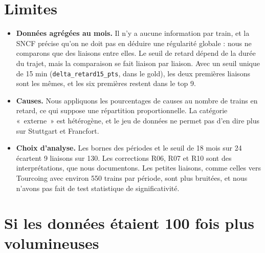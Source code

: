 \documentclass[10pt,a4paper]{article}
\newcommand{\code}[1]{\texttt{\small #1}}
\begin{document}
\section{Limites}
\begin{itemize}
  \item \textbf{Données agrégées au mois.} Il n'y a aucune information par train, et la SNCF précise qu'on ne doit pas en déduire une régularité globale : nous ne comparons que des liaisons entre elles. Le seuil de retard dépend de la durée du trajet, mais la comparaison se fait liaison par liaison. Avec un seuil unique de 15 min (\code{delta\_retard15\_pts}, dans le gold), les deux premières liaisons sont les mêmes, et les six premières restent dans le top 9.
  \item \textbf{Causes.} Nous appliquons les pourcentages de causes au nombre de trains en retard, ce qui suppose une répartition proportionnelle. La catégorie «~externe~» est hétérogène, et le jeu de données ne permet pas d'en dire plus sur Stuttgart et Francfort.
  \item \textbf{Choix d'analyse.} Les bornes des périodes et le seuil de 18 mois sur 24 écartent 9 liaisons sur 130. Les corrections R06, R07 et R10 sont des interprétations, que nous documentons. Les petites liaisons, comme celles vers Tourcoing avec environ 550 trains par période, sont plus bruitées, et nous n'avons pas fait de test statistique de significativité.
\end{itemize}

\section{Si les données étaient 100 fois plus volumineuses}
\end{document}
